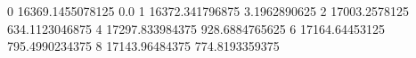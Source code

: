 0 16369.1455078125 0.0
1 16372.341796875 3.1962890625
2 17003.2578125 634.1123046875
4 17297.833984375 928.6884765625
6 17164.64453125 795.4990234375
8 17143.96484375 774.8193359375
